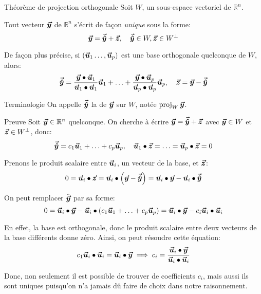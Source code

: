 \documentclass[a4paper]{article}
\begin{document}
\begin{parag}{Théorème de projection orthogonale}
    Soit $W$, un sous-espace vectoriel de $\mathbb{R}^n$.

    Tout vecteur $\bm{\protect\vec{y}}$ de $\mathbb{R}^n$ s'écrit de façon \textit{unique} sous la forme:
    \[\bm{\protect\vec{y}} = \bm{\protect\vec{\hat{y}}} + \bm{\protect\vec{z}}, \quad \bm{\protect\vec{\hat{y}}} \in W, \bm{\protect\vec{z}} \in W^\perp\]

    De façon plus précise, si $\left(\bvec{u}_1 \ldots, \bvec{u}_p\right)$ est une base orthogonale quelconque de $W$, alors:
    \[\bm{\protect\vec{\hat{y}}} = \frac{\bm{\protect\vec{y}} \bullet \bm{\protect\vec{u}}_1}{\bm{\protect\vec{u}}_1 \bullet \bm{\protect\vec{u}}_1} \bm{\protect\vec{u}}_1 + \ldots + \frac{\bm{\protect\vec{y}} \bullet \bm{\protect\vec{u}}_p}{\bm{\protect\vec{u}}_p \bullet \bm{\protect\vec{u}}_p} \bm{\protect\vec{u}}_p, \quad \bm{\protect\vec{z}} = \bm{\protect\vec{y}} - \bm{\protect\vec{\hat{y}}}\]

    \begin{subparag}{Terminologie}
        On appelle $\bm{\protect\vec{\hat{y}}}$ la  de $\bm{\protect\vec{y}}$ sur $W$, notée $\operatorname{proj}_W \bm{\protect\vec{y}}$.
    \end{subparag}


    \begin{subparag}{Preuve}
        Soit $\bm{\protect\vec{y}} \in \mathbb{R}^n$ quelconque. On cherche à écrire $\bm{\protect\vec{y}} = \bm{\protect\vec{\hat{y}}} + \bm{\protect\vec{z}}$ avec $\bm{\protect\vec{y}} \in W$ et $\bm{\protect\vec{z}} \in W^\perp$, donc:
        \[\bm{\protect\vec{\hat{y}}} = c_1 \bm{\protect\vec{u}}_1 + \ldots + c_p \bm{\protect\vec{u}}_p, \quad \bm{\protect\vec{u}}_1 \bullet \bm{\protect\vec{z}} = \ldots = \bm{\protect\vec{u}}_p \bullet \bm{\protect\vec{z}} = 0\]

        Prenons le produit scalaire entre $\bm{\protect\vec{u}}_i$, un vecteur de la base, et $\bm{\protect\vec{z}}$:
        \[0 = \bvec{u}_i \dotprod \bvec{z} = \bvec{u}_i \dotprod \left(\bvec{y} - \bvec{\hat{y}}\right) = \bvec{u}_i \dotprod \bvec{y} - \bvec{u}_i \dotprod \bvec{\hat{y}}\]

        On peut remplacer $\hat{\bm{\protect\vec{y}}}$ par sa forme:
        \[0 = \bvec{u}_i \dotprod \bvec{y} - \bvec{u}_i \dotprod \left(c_1 \bvec{u}_1 + \ldots + c_p \bvec{u}_p\right) = \bvec{u}_i \dotprod \bvec{y} - c_i \bvec{u}_i \dotprod \bvec{u}_i\]

        En effet, la base est orthogonale, donc le produit scalaire entre deux vecteurs de la base différents donne zéro. Ainsi, on peut résoudre cette équation:
        \[c_1 \bm{\protect\vec{u}}_i \bullet \bm{\protect\vec{u}}_i = \bm{\protect\vec{u}}_i \bullet \bm{\protect\vec{y}} \implies c_i = \frac{\bm{\protect\vec{u}}_i \bullet \bm{\protect\vec{y}}}{\bm{\protect\vec{u}}_i \bullet \bm{\protect\vec{u}}_i}\]

        Donc, non seulement il est possible de trouver de coefficients $c_i$, mais aussi ils sont uniques puisqu'on n'a jamais dû faire de choix dans notre raisonnement.


\end{subparag}
\end{parag}
\end{document}
